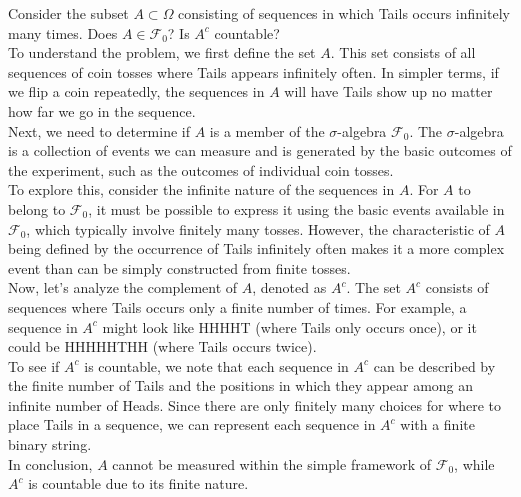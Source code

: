 \begin{example}
    Consider the subset \( A \subset \Omega \) consisting of sequences in which Tails occurs infinitely many times. Does \( A \in \mathcal{F}_0 \)? Is \( A^c \) countable?\\

    To understand the problem, we first define the set \( A \). This set consists of all sequences of coin tosses where Tails appears infinitely often. In simpler terms, if we flip a coin repeatedly, the sequences in \( A \) will have Tails show up no matter how far we go in the sequence.\\

    Next, we need to determine if \( A \) is a member of the \(\sigma\)-algebra \( \mathcal{F}_0 \). The \(\sigma\)-algebra is a collection of events we can measure and is generated by the basic outcomes of the experiment, such as the outcomes of individual coin tosses.\\
    
    To explore this, consider the infinite nature of the sequences in \( A \). For \( A \) to belong to \( \mathcal{F}_0 \), it must be possible to express it using the basic events available in \( \mathcal{F}_0\), which typically involve finitely many tosses. However, the characteristic of \( A \) being defined by the occurrence of Tails infinitely often makes it a more complex event than can be simply constructed from finite tosses.\\
    
    Now, let’s analyze the complement of \( A \), denoted as \( A^c \). The set \( A^c \) consists of sequences where Tails occurs only a finite number of times. For example, a sequence in \( A^c \) might look like HHHHT (where Tails only occurs once), or it could be HHHHHTHH (where Tails occurs twice). \\
    
    To see if \( A^c \) is countable, we note that each sequence in \( A^c \) can be described by the finite number of Tails and the positions in which they appear among an infinite number of Heads. Since there are only finitely many choices for where to place Tails in a sequence, we can represent each sequence in \( A^c \) with a finite binary string.\\
    
    In conclusion, \( A \) cannot be measured within the simple framework of \(\mathcal{F}_0\), while \( A^c \) is countable due to its finite nature.
\end{example}

